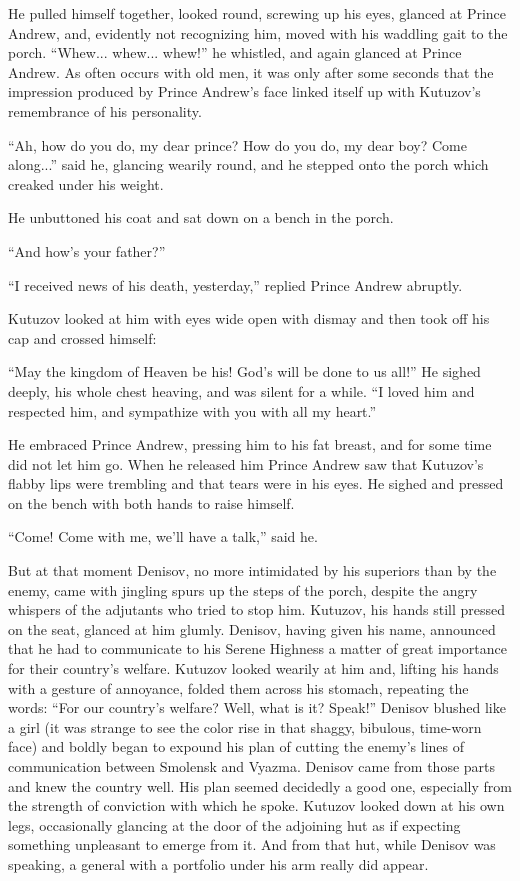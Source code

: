 He pulled himself together, looked round, screwing up his eyes,
glanced at Prince Andrew, and, evidently not recognizing him,
moved with his waddling gait to the
porch. ``Whew... whew... whew!'' he whistled, and again glanced
at Prince Andrew. As often occurs with old men, it was only after
some seconds that the impression produced by Prince Andrew's face
linked itself up with Kutuzov's remembrance of his personality.

``Ah, how do you do, my dear prince? How do you do, my dear boy?
Come along...'' said he, glancing wearily round, and he stepped
onto the porch which creaked under his weight.

He unbuttoned his coat and sat down on a bench in the porch.

``And how's your father?''

``I received news of his death, yesterday,'' replied Prince
Andrew abruptly.

Kutuzov looked at him with eyes wide open with dismay and then
took off his cap and crossed himself:

``May the kingdom of Heaven be his! God's will be done to us
all!'' He sighed deeply, his whole chest heaving, and was silent
for a while. ``I loved him and respected him, and sympathize with
you with all my heart.''

He embraced Prince Andrew, pressing him to his fat breast, and
for some time did not let him go. When he released him Prince
Andrew saw that Kutuzov's flabby lips were trembling and that
tears were in his eyes. He sighed and pressed on the bench with
both hands to raise himself.

``Come! Come with me, we'll have a talk,'' said he.

But at that moment Denisov, no more intimidated by his superiors
than by the enemy, came with jingling spurs up the steps of the
porch, despite the angry whispers of the adjutants who tried to
stop him. Kutuzov, his hands still pressed on the seat, glanced
at him glumly. Denisov, having given his name, announced that he
had to communicate to his Serene Highness a matter of great
importance for their country's welfare.  Kutuzov looked wearily
at him and, lifting his hands with a gesture of annoyance, folded
them across his stomach, repeating the words: ``For our country's
welfare? Well, what is it? Speak!'' Denisov blushed like a girl
(it was strange to see the color rise in that shaggy, bibulous,
time-worn face) and boldly began to expound his plan of cutting
the enemy's lines of communication between Smolensk and
Vyazma. Denisov came from those parts and knew the country
well. His plan seemed decidedly a good one, especially from the
strength of conviction with which he spoke.  Kutuzov looked down
at his own legs, occasionally glancing at the door of the
adjoining hut as if expecting something unpleasant to emerge from
it. And from that hut, while Denisov was speaking, a general with
a portfolio under his arm really did appear.

